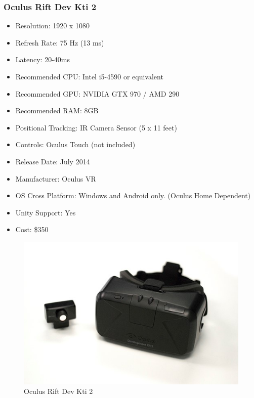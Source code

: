 \documentclass[a4paper,10pt]{article}
\begin{document}
\subsubsection{Oculus Rift Dev Kti 2}
\begin{itemize}
	\item Resolution: 1920 x 1080
	\item Refresh Rate: 75 Hz (13 ms)
	\item Latency: 20-40ms
	\item Recommended CPU: Intel i5-4590 or equivalent
	\item Recommended GPU: NVIDIA GTX 970 / AMD 290 
	\item Recommended RAM: 8GB
	\item Positional Tracking: IR Camera Sensor (5 x 11 feet)
	\item Controls: Oculus Touch (not included)
	\item Release Date: July 2014
	\item Manufacturer: Oculus VR
	\item OS Cross Platform: Windows and Android only. (Oculus Home Dependent)
	\item Unity Support: Yes
	\item Cost: \$350
\end{itemize}
\begin{figure}[H]
	\includegraphics[width=\linewidth,height=\paperheight,keepaspectratio]{dk2.jpg}
	\caption{Oculus Rift Dev Kti 2}
	\label{fig:Riftdk2Img}
	\end{figure}
	\pagebreak
\end{document}
